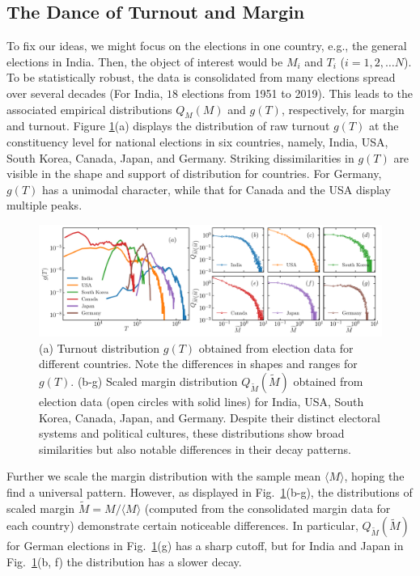 \subsection{The Dance of Turnout and Margin}

To fix our ideas, we might focus on the elections in one country, e.g., the general elections in India. Then, the object of interest would be $M_i$ and $T_i$ ($i=1,2, \dots N$). To be statistically robust, the data is consolidated from many elections spread over several decades (For India, $18$ elections from 1951 to 2019). This leads to the associated empirical distributions $Q_M(M)$ and $g(T)$, respectively, for margin and turnout. Figure \ref{fig:turnout_margin}(a) displays the distribution of raw turnout $g(T)$ at the constituency level for national elections in six countries, namely, India, USA, South Korea, Canada, Japan, and Germany. Striking dissimilarities in $g(T)$ are visible in the shape and support of distribution for countries. For Germany, $g(T)$ has a unimodal character, while that for Canada and the USA display multiple peaks. 


\begin{figure}[H]
    \centering
    \includegraphics[width=\textwidth]{chapters/chapter4/turnout_margin_empirical_distribution_pc.pdf}
    \caption{(a) Turnout distribution $g(T)$ obtained from election data for different countries. Note the differences in shapes and ranges for $g(T)$. (b-g) Scaled margin distribution $Q_{\widetilde{M}}\left(\widetilde{M}\right)$ obtained from election data (open circles with solid lines) for India, USA, South Korea, Canada, Japan, and Germany. Despite their distinct electoral systems and political cultures, these distributions show broad similarities but also notable differences in their decay patterns.}
    \label{fig:turnout_margin}
\end{figure}

Further we scale the margin distribution with the sample mean $\langle M \rangle$, hoping the find a universal pattern. However, as displayed in Fig.~\ref{fig:turnout_margin}(b-g), the distributions of scaled margin $\widetilde{M} = M/\langle M \rangle$ (computed from the consolidated margin data for each country) demonstrate certain noticeable differences. In particular, $Q_{\widetilde{M}}\left(\widetilde{M}\right)$ for German elections in Fig.~\ref{fig:turnout_margin}(g) has a sharp cutoff, but for India and Japan in Fig.~\ref{fig:turnout_margin}(b, f) the distribution has a slower decay. 

